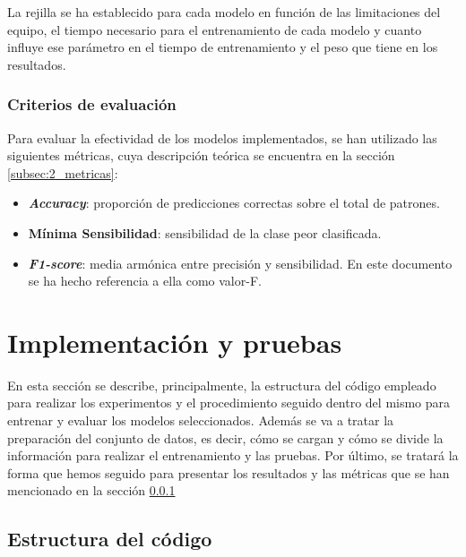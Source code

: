 \vspace{1em}

La rejilla se ha establecido para cada modelo en función de las limitaciones del equipo, el tiempo necesario para el entrenamiento de cada modelo y cuanto influye ese parámetro en el tiempo de entrenamiento y el peso que tiene en los resultados.

\subsubsection{Criterios de evaluación}
\label{subsubsec:evaluacion}

Para evaluar la efectividad de los modelos implementados, se han utilizado las siguientes métricas, cuya descripción teórica se encuentra en la sección \ref{subsec:2_metricas}:

\begin{itemize}
	\item \textbf{\textit{Accuracy}}: proporción de predicciones correctas sobre el total de patrones.
	\item \textbf{Mínima Sensibilidad}: sensibilidad de la clase peor clasificada.
	\item \textbf{\textit{F1-score}}: media armónica entre precisión y sensibilidad. En este documento se ha hecho referencia a ella como valor-F.
\end{itemize}

\section{Implementación y pruebas}
\label{sec:implementacion}

En esta sección se describe, principalmente, la estructura del código empleado para realizar los experimentos y el procedimiento seguido dentro del mismo para entrenar y evaluar los modelos seleccionados. Además se va a tratar la preparación del conjunto de datos, es decir, cómo se cargan y cómo se divide la información para realizar el entrenamiento y las pruebas. Por último, se tratará la forma que hemos seguido para presentar los resultados y las métricas que se han mencionado en la sección \ref{subsubsec:evaluacion}

\subsection{Estructura del código}
\label{subsec:estructura_codigo}



